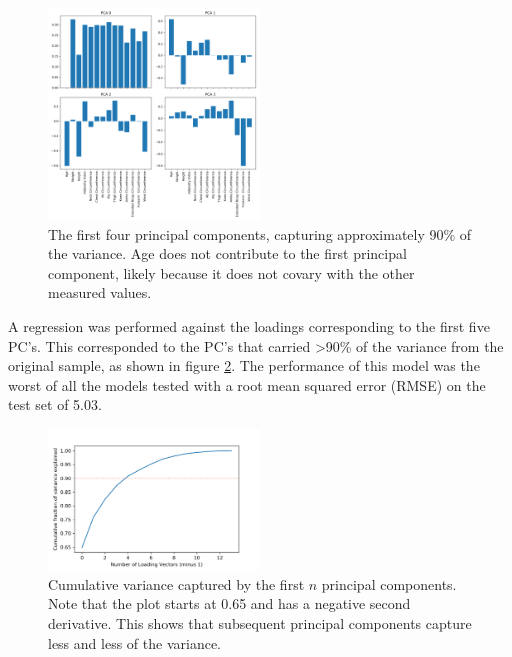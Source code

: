 \documentclass{IEEEtran}
\begin{document}
\begin{centering}
\begin{figure}
\centering
\begin{center}
	\includegraphics[width=0.5\textwidth]{first_four_pca}
	\caption{The first four principal components, capturing approximately 90\% of the variance. Age does not contribute to the first principal component, likely because it does not covary with the other measured values.\label{fig:first_four_pca}}
\end{center}
\end{figure}
\end{centering}

A regression was performed against the loadings corresponding to the first five PC's. This corresponded to the PC's that carried \textgreater90\% of the variance from the original sample, as shown in figure \ref{fig:cumulative_variance}. The performance of this model was the worst of all the models tested with a root mean squared error (RMSE) on the test set of \num{5.03}.

\begin{centering}
\begin{figure}
\centering
\begin{center}
	\includegraphics[width=0.5\textwidth]{cumulative_variance}
	\caption{Cumulative variance captured by the first $n$ principal components. Note that the plot starts at 0.65 and has a negative second derivative. This shows that subsequent principal components capture less and less of the variance.\label{fig:cumulative_variance}}
\end{center}
\end{figure}
\end{centering}
\end{document}
